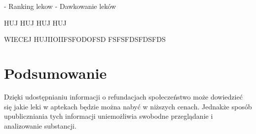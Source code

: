 \documentclass{article}
\begin{document}
- Ranking lekow
- Dawkowanie leków

HUJ HUJ HUJ HUJ

WIECEJ HUJIIOIIFSFODOFSD
FSFSFDSFDSFDS

\section{Podsumowanie}

Dzięki udostępnianiu informacji o refundacjach społeczeństwo może dowiedzieć się jakie leki w aptekach będzie można nabyć w niższych cenach. Jednakże sposób upubliczniania tych informacji uniemożliwia swobodne przeglądanie i analizowanie substancji.
\end{document}
